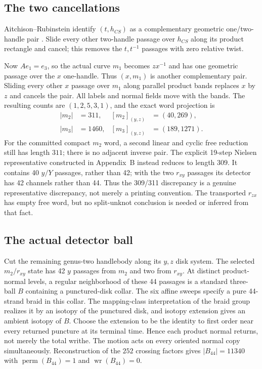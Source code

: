 \documentclass[11pt]{amsart}
\theoremstyle{definition}
\theoremstyle{remark}
\begin{document}
\subsection{The two cancellations}

Aitchison--Rubinstein identify $(t,h_{CS})$ as a complementary geometric
one/two-handle pair \cite[p.~7]{AitchisonRubinstein1984}.  Slide every other
two-handle passage over $h_{CS}$ along its product rectangle and cancel; this
removes the $t,t^{-1}$ passages with zero relative twist.

Now $Ae_1=e_3$, so the actual curve $m_1$ becomes $zx^{-1}$ and has one
geometric passage over the $x$ one-handle.  Thus $(x,m_1)$ is another
complementary pair.  Sliding every other $x$ passage over $m_1$ along parallel
product bands replaces $x$ by $z$ and cancels the pair.  All labels and
normal fields move with the bands.  The resulting counts are $(1,2,5,3,1)$,
and the exact word projection is
\[
\begin{aligned}
|m_2|&=311, & [m_2]_{(y,z)}&=(40,269),\\
|m_3|&=1460, & [m_3]_{(y,z)}&=(189,1271).
\end{aligned}
\]
For the committed compact $m_2$ word, a second linear and cyclic free
reduction still has length $311$; there is no adjacent inverse pair.  The
explicit 19-step Nielsen representative constructed in Appendix~B instead
reduces to length $309$.  It contains 40 $y/Y$ passages, rather than 42; with
the two $r_{xy}$ passages its detector has 42 channels rather than 44.  Thus
the 309/311 discrepancy is a genuine representative discrepancy, not merely
a printing convention.
The transported $r_{zx}$ has empty free word, but no split-unknot conclusion
is needed or inferred from that fact.

\subsection{The actual detector ball}

Cut the remaining genus-two handlebody along its $y,z$ disk system.  The
selected $m_2/r_{xy}$ state has 42 $y$ passages from $m_2$ and two from
$r_{xy}$.  At distinct product-normal levels, a regular neighborhood of these
44 passages is a standard three-ball $B$ containing a punctured-disk collar.
The six affine sweeps specify a pure 44-strand braid in this collar.  The
mapping-class interpretation of the braid group realizes it by an isotopy of
the punctured disk, and isotopy extension gives an ambient isotopy of $B$.
Choose the extension to be the identity to first order near every returned
puncture at its terminal time.  Hence each product normal returns, not merely
the total writhe.  The motion acts on every oriented normal copy
simultaneously.  Reconstruction of the $252$ crossing factors gives
$|B_{44}|=11340$ with $\operatorname{perm}(B_{44})=1$ and
$\operatorname{wr}(B_{44})=0$.
\end{document}
